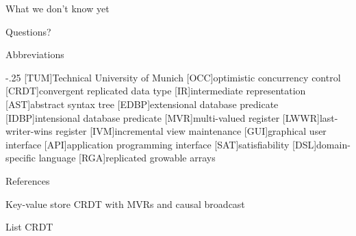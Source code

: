 \documentclass[USenglish,aspectratio=169]{beamer} %
\newcommand{\backupbegin}{
   \newcounter{framenumberappendix}
   \setcounter{framenumberappendix}{\value{framenumber}}
}
\newcommand{\backupend}{
   \addtocounter{framenumberappendix}{-\value{framenumber}}
   \addtocounter{framenumber}{\value{framenumberappendix}}
}
\begin{document}
\begin{frame}{What we don't know yet}
    \begin{itemize}
    \end{itemize}

\end{frame}

\begin{frame}[standout]
    \begin{center}
        Questions?
    \end{center}
\end{frame}

\begin{frame}{Abbreviations}
\begin{acronym}
    \itemsep-.25\baselineskip
    [TUM]{Technical University of Munich}
    [OCC]{optimistic concurrency control}
    [CRDT]{convergent replicated data type}
    [IR]{intermediate representation}
    [AST]{abstract syntax tree}
    [EDBP]{extensional database predicate}
    [IDBP]{intensional database predicate}
    [MVR]{multi-valued register}
    [LWWR]{last-writer-wins register}
    [IVM]{incremental view maintenance}
    [GUI]{graphical user interface}
    [API]{application programming interface}
    [SAT]{satisfiability}
    [DSL]{domain-specific language}
    [RGA]{replicated growable arrays}
\end{acronym}
\end{frame}

\begin{frame}[allowframebreaks]{References}
    \printbibliography[heading=none]
\end{frame}


\appendix

\backupbegin

\begin{frame}{Key-value store \acs{CRDT} with \acsp{MVR} and causal broadcast}
\end{frame}

\begin{frame}{List CRDT}
\end{frame}

\backupend
\end{document}
